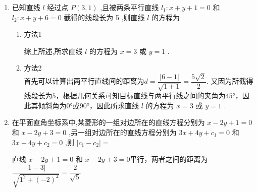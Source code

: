 \begin{enumerate}
\begin{enumerate}
        \item 已知直线 $l$ 经过点 $P\left( {3,1}\right)$ ,且被两条平行直线 ${l}_{1} : x + y + 1 = 0$ 和 ${l}_{2} : x + y + 6 = 0$ 截得的线段长为 5 ,则直线 $l$ 的方程为
        \begin{jieda}
            \begin{enumerate}
                \item 方法1
                综上所述,所求直线 $l$ 的方程为 $x = 3$ 或 $y = 1$ .
                \item 方法2 \\
                首先可以计算出两平行直线间的距离为$d = \dfrac{|6-1|}{\sqrt{1+1}} = \dfrac{5\sqrt{2}}{2}$. 又因为所截得线段长为$5$，根据几何关系可知目标直线与两平行线之间的夹角为$\ang{45}$，因此其倾斜角为$\ang{0}$或$\ang{90}$，因此所求直线 $l$ 的方程为 $x = 3$ 或 $y = 1$ .
            \end{enumerate}
        \end{jieda}
        \item 在平面直角坐标系中,某菱形的一组对边所在的直线方程分别为 $x - {2y} + 1 = 0$ 和 $x - {2y} + 3 = 0$ ,另一组对边所在的直线方程分别为 ${3x} + {4y} + {c}_{1} = 0$ 和 ${3x} + {4y} + {c}_{2} = 0$ ,则 $\left| {{c}_{1} - {c}_{2}}\right| = $
        \begin{jieda}
            直线 $x - {2y} + 1 = 0$ 和 $x - {2y} + 3 = 0$平行，两者之间的距离为 $\dfrac{\left| 1 - 3\right| }{\sqrt{{1}^{2} + {\left( -2\right) }^{2}}} = \dfrac{2}{\sqrt{5}}$
            

\end{jieda}
\end{enumerate}
\end{enumerate}
